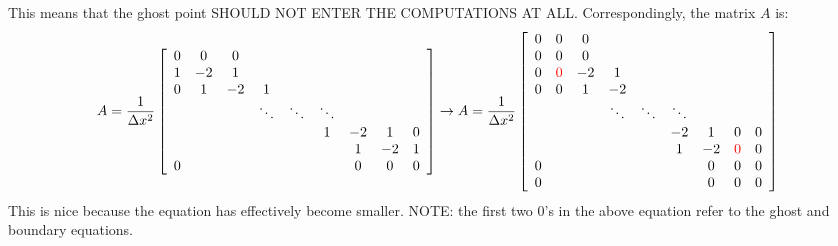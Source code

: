 \documentclass[landscape]{article}
\begin{document}
This means that the ghost point SHOULD NOT ENTER THE COMPUTATIONS AT ALL. Correspondingly, the matrix $A$ is:
\[ A = \frac{1}{\Delta x^2} \left[\begin{array}{ccccccccc}
0  & 0     & 0         &           &           &           &           &         &    \\
1  & -2    & 1         &           &           &           &           &         &    \\
0  & 1     & -2        & 1         &           &           &           &         &    \\
   &       &           & \ddots    & \ddots    & \ddots    &           &         &    \\
   &       &           &           &           & 1         & -2        & 1       &  0 \\
   &       &           &           &           &           &  1        & -2      &  1 \\
0  &       &           &           &           &           &  0        & 0       &  0 \\
\end{array} \right]
\rightarrow
A = \frac{1}{\Delta x^2} \left[\begin{array}{ccccccccc}
0  & 0     & 0         &           &           &           &           &         &    \\
0  & 0     & 0         &           &           &           &           &         &    \\
0  & \textcolor{red}{0}     & -2        & 1         &           &           &           &         &    \\
0  & 0     & 1         & -2        &           &           &           &         &    \\
   &       &           & \ddots    & \ddots    & \ddots    &           &         &    \\
   &       &           &           &           & -2        & 1         & 0       &  0 \\
   &       &           &           &           & 1         & -2        & \textcolor{red}{0}       &  0 \\
0  &       &           &           &           &           &  0        & 0       &  0 \\
0  &       &           &           &           &           &  0        & 0       &  0 \\
\end{array} \right]
\]
This is nice because the equation has effectively become smaller. NOTE: the first two 0's in the above equation refer to the ghost and boundary equations.
\end{document}
